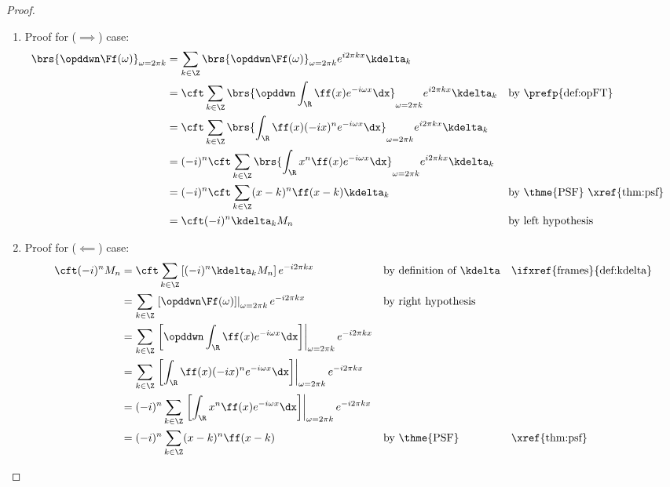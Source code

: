 \begin{proof}
\begin{enumerate}
  \item Proof for ($\implies$) case:
    \begin{align*}
      \brs{\opddwn  \Ff(\omega)}_{\omega=2\pi k}
        &= \sum_{k\in\Z} \brs{\opddwn  \Ff(\omega)}_{\omega=2\pi k}  e^{i2\pi kx} \kdelta_k
      \\&= \cft \sum_{k\in\Z} \brs{\opddwn \int_\R  \ff(x) e^{-i\omega x} \dx}_{\omega=2\pi k} e^{i2\pi kx}  \kdelta_k
        && \text{by \prefp{def:opFT}}
      \\&= \cft \sum_{k\in\Z} \brs{\int_\R  \ff(x)(-ix)^n e^{-i\omega x} \dx}_{\omega=2\pi k} e^{i2\pi kx}  \kdelta_k
      \\&= (-i)^n \cft \sum_{k\in\Z} \brs{\int_\R  x^n \ff(x)  e^{-i\omega x} \dx}_{\omega=2\pi k} e^{i2\pi kx}  \kdelta_k
      \\&= (-i)^n \cft \sum_{k\in\Z} (x-k)^n \ff(x-k)  \kdelta_k
        && \text{by \thme{PSF} \xref{thm:psf}}
      \\&= \cft (-i)^n \kdelta_k M_n
        && \text{by left hypothesis}
    \end{align*}

 
  \item Proof for ($\impliedby$) case:
    \begin{align*}
      \cft (-i)^n M_n
        &= \cft \sum_{k\in\Z} \left[(-i)^n \kdelta_k M_n \right] e^{-i2\pi kx}
        && \text{by definition of $\kdelta$}
        && \text{\ifxref{frames}{def:kdelta}}
      \\&= \sum_{k\in\Z} \left. 
           \left[\opddwn  \Ff(\omega)\right]\right|_{\omega=2\pi k} 
           e^{-i2\pi kx}
        && \text{by right hypothesis}
      \\&= \sum_{k\in\Z} \left. 
           \left[
           \opddwn 
           \int_\R  \ff(x) e^{-i\omega x} \dx
           \right]
           \right|_{\omega=2\pi k} e^{-i2\pi kx}
      \\&= \sum_{k\in\Z} \left. 
           \left[
           \int_\R  \ff(x)(-ix)^n e^{-i\omega x} \dx
           \right]
           \right|_{\omega=2\pi k} e^{-i2\pi kx}
      \\&= (-i)^n \sum_{k\in\Z} \left.
           \left[
           \int_\R  x^n \ff(x)  e^{-i\omega x} \dx
           \right]
           \right|_{\omega=2\pi k} e^{-i2\pi kx}
      \\&= (-i)^n \sum_{k\in\Z} (x-k)^n \ff(x-k) 
        && \text{by \thme{PSF}}
        && \text{\xref{thm:psf}}
    \end{align*}

\end{enumerate}
\end{proof}

